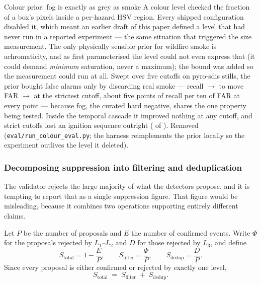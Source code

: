 \begin{recorded}{Colour prior: fog is exactly as grey as smoke}
A colour level checked the fraction of a box's pixels inside a per-hazard HSV
region. Every shipped configuration disabled it, which meant an earlier
draft of this paper defined a level that had never run in a reported
experiment — the same situation that triggered the size measurement. The only
physically sensible prior for wildfire smoke is achromaticity, and as first
parameterised the level could not even express that (it could demand
\emph{minimum} saturation, never a maximum); the bound was added so the
measurement could run at all. Swept over five cutoffs on \ColourStillsImages{}
pyro-sdis stills, the prior bought false alarms only by discarding real
smoke — recall \ColourBaselineRecall{} $\to$ \ColourStrictRecall{} to move
FAR \ColourBaselineFAR{} $\to$ \ColourStrictFAR{} at the strictest cutoff,
about five points of recall per ten of FAR at every point — because fog, the
curated hard negative, shares the one property being tested. Inside the
temporal cascade it improved nothing at any cutoff, and strict cutoffs lost
an ignition sequence outright (\ColourStrictFires{} of \FiresTotal). Removed
(\texttt{eval/run\_colour\_eval.py}; the harness reimplements the prior
locally so the experiment outlives the level it deleted).
\end{recorded}

\subsubsection{Decomposing suppression into filtering and deduplication}
\label{sec:decomposition}

The validator rejects the large majority of what the detectors propose, and it
is tempting to report that as a single suppression figure. That figure would
be misleading, because it combines two operations supporting entirely
different claims.

\begin{definition}
\label{def:decomposition}
Let $P$ be the number of proposals and $E$ the number of confirmed events.
Write $\Phi$ for the proposals rejected by $L_1$--$L_2$ and $D$ for those
rejected by $L_3$, and define
\begin{equation}
  S_{\text{total}} = 1 - \frac{E}{P},
  \qquad
  S_{\text{filter}} = \frac{\Phi}{P},
  \qquad
  S_{\text{dedup}} = \frac{D}{P}.
  \label{eq:decomposition-terms}
\end{equation}
Since every proposal is either confirmed or rejected by exactly one level,
\begin{equation}
  S_{\text{total}} \;=\; S_{\text{filter}} \;+\; S_{\text{dedup}}.
  \label{eq:decomposition}
\end{equation}
\end{definition}

